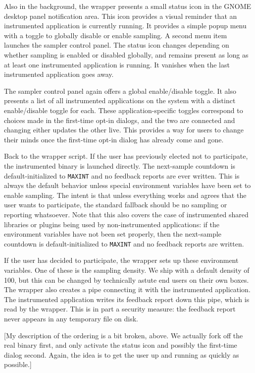 \documentclass[10pt,twocolumn]{article}
\begin{document}
Also in the background, the wrapper presents a small status icon in
the GNOME desktop panel notification area.  This icon provides a
visual reminder that an instrumented application is currently running.
It provides a simple popup menu with a toggle to globally disable or
enable sampling.  A second menu item launches the sampler control
panel.  The status icon changes depending on whether sampling is
enabled or disabled globally, and remains present as long as at least
one instrumented application is running.  It vanishes when the last
instrumented application goes away.

The sampler control panel again offers a global enable/disable toggle.
It also presents a list of all instrumented applications on the system
with a distinct enable/disable toggle for each.  These
application-specific toggles correspond to choices made in the
first-time opt-in dialogs, and the two are connected and changing
either updates the other live.  This provides a way for users to
change their minds once the first-time opt-in dialog has already come
and gone.

Back to the wrapper script.  If the user has previously elected not to
participate, the instrumented binary is launched directly.  The
next-sample countdown is default-initialized to \texttt{MAXINT} and no
feedback reports are ever written.  This is always the default
behavior unless special environment variables have been set to enable
sampling.  The intent is that unless everything works and agrees that
the user wants to participate, the standard fallback should be no
sampling or reporting whatsoever.  Note that this also covers the case
of instrumented shared libraries or plugins being used by
non-instrumented applications: if the environment variables have not
been set properly, then the next-sample countdown is
default-initialized to \texttt{MAXINT} and no feedback reports are
written.

If the user has decided to participate, the wrapper sets up these
environment variables.  One of these is the sampling density.  We ship
with a default density of 100, but this can be changed by technically
astute end users on their own boxes.  The wrapper also creates a pipe
connecting it with the instrumented application.  The instrumented
application writes its feedback report down this pipe, which is read
by the wrapper.  This is in part a security measure: the feedback
report never appears in any temporary file on disk.

[My description of the ordering is a bit broken, above.  We actually
fork off the real binary first, and only activate the status icon and
possibly the first-time dialog second.  Again, the idea is to get the
user up and running as quickly as possible.]
\end{document}
